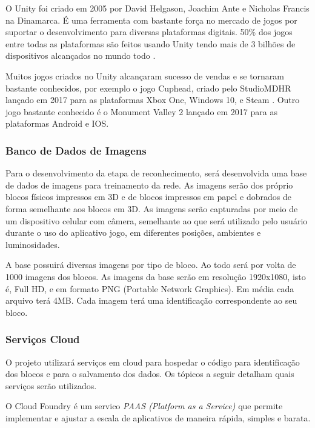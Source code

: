    
            O Unity foi criado em 2005 por David Helgason, Joachim Ante e Nicholas
            Francis na Dinamarca. É uma ferramenta com bastante força no mercado de jogos por suportar o desenvolvimento para diversas plataformas digitais. 50\% dos jogos entre todas as plataformas são feitos usando Unity tendo mais de 3 bilhões de dispositivos alcançados no mundo todo \cite{dados_unity}.
            
            Muitos jogos criados no Unity alcançaram sucesso de vendas e se tornaram bastante conhecidos, por exemplo o jogo Cuphead, criado pelo StudioMDHR lançado em 2017 para as plataformas Xbox One, Windows 10, e Steam \cite{cuphead}. Outro jogo bastante conhecido é o Monument Valley 2 lançado em 2017 para as plataformas Android e IOS\cite{monument_valley_2}.

    
       \subsubsection{Banco de Dados de Imagens}    
        
        Para o desenvolvimento da etapa de reconhecimento, será desenvolvida uma base de dados de imagens para treinamento da rede. As imagens serão dos próprio blocos físicos impressos em 3D e de blocos impressos em papel e dobrados de forma semelhante aos blocos em 3D.	As imagens serão capturadas por meio de um dispositivo celular com câmera, semelhante ao que será utilizado pelo usuário durante o uso do aplicativo jogo, em diferentes posições, ambientes e luminosidades. 
        
        A base possuirá diversas imagens por tipo de bloco. Ao todo será por volta de 1000 imagens dos blocos. As imagens da base serão em resolução 1920x1080, isto é, Full HD, e em formato PNG (Portable Network Graphics). Em média cada arquivo terá 4MB. Cada imagem terá uma identificação correspondente ao seu bloco. 

        \subsubsection{Serviços Cloud}
            O projeto utilizará serviços em cloud para hospedar o código para identificação dos blocos e para o salvamento dos dados.
            Os tópicos a seguir detalham quais serviços serão utilizados.
            
        O Cloud Foundry é um servico \textit{PAAS (Platform as a Service)} que permite implementar e ajustar a escala de aplicativos de maneira rápida, simples e barata.
        
